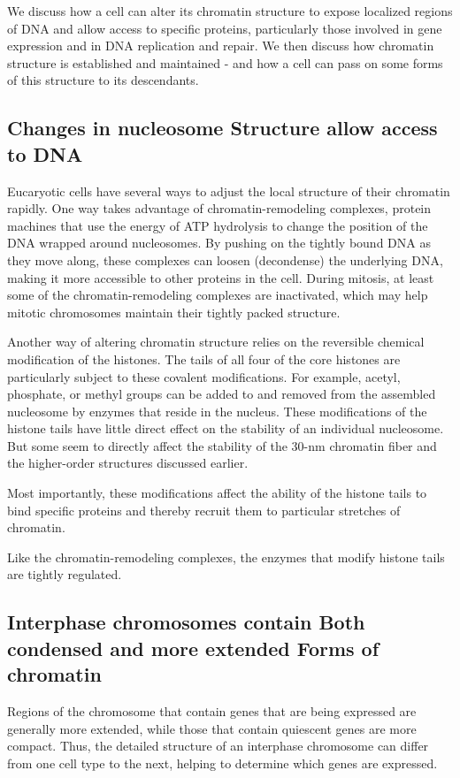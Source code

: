 We discuss how a cell can alter its chromatin structure to
expose localized regions of DNA and allow access to specific proteins,
particularly those involved in gene expression and in DNA replication
and repair. We then discuss how chromatin structure is established and
maintained - and how a cell can pass on some forms of this structure
to its descendants.

\subsection{Changes in nucleosome Structure allow access to DNA}

Eucaryotic cells have several ways to adjust the local structure of their
chromatin rapidly. One way takes advantage of chromatin-remodeling
complexes, protein machines that use the energy of ATP hydrolysis to
change the position of the DNA wrapped around nucleosomes. By pushing
on the tightly bound DNA as they move along, these complexes can
loosen (decondense) the underlying DNA, making it more accessible to
other proteins in the cell. During mitosis, at least some of
the chromatin-remodeling complexes are inactivated, which may help
mitotic chromosomes maintain their tightly packed structure.

Another way of altering chromatin structure relies on the reversible chemical
modification of the histones. The tails of all four of the core histones
are particularly subject to these covalent modifications. For example,
acetyl, phosphate, or methyl groups can be added to and removed from
the assembled nucleosome by enzymes that reside in the nucleus. These
modifications of the histone tails have little direct effect on the stability of
an individual nucleosome. But some seem to directly affect the stability
of the 30-nm chromatin fiber and the higher-order structures discussed
earlier.

Most importantly, these modifications affect the ability of the histone tails
to bind specific proteins and thereby recruit them to particular stretches
of chromatin.

Like the chromatin-remodeling complexes, the enzymes that modify histone
tails are tightly regulated.

\subsection{Interphase chromosomes contain Both condensed and more extended Forms of chromatin}

Regions of the chromosome that contain
genes that are being expressed are generally more extended, while those
that contain quiescent genes are more compact. Thus, the detailed structure
of an interphase chromosome can differ from one cell type to the
next, helping to determine which genes are expressed.

